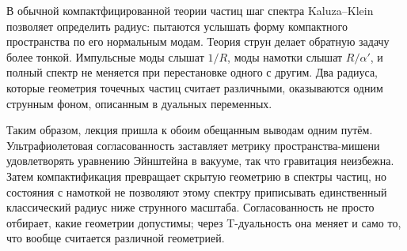 В обычной компактфицированной теории частиц шаг спектра
Kaluza--Klein позволяет определить радиус: пытаются услышать форму
компактного пространства по его нормальным модам. Теория струн делает обратную
задачу более тонкой. Импульсные моды слышат \(1/R\), моды намотки слышат
\(R/\alpha'\), и полный спектр не меняется при перестановке одного с другим.
Два радиуса, которые геометрия точечных частиц считает различными,
оказываются одним струнным фоном, описанным в дуальных переменных.

Таким образом, лекция пришла к обоим обещанным выводам одним путём. Ультрафиолетовая согласованность заставляет метрику пространства-мишени удовлетворять уравнению Эйнштейна в вакууме, так что гравитация неизбежна. Затем компактификация превращает скрытую геометрию в спектры частиц, но состояния с намоткой не позволяют этому спектру приписывать единственный классический радиус ниже струнного масштаба. Согласованность не просто отбирает, какие геометрии допустимы; через T-дуальность она меняет и само то, что вообще считается различной геометрией.
